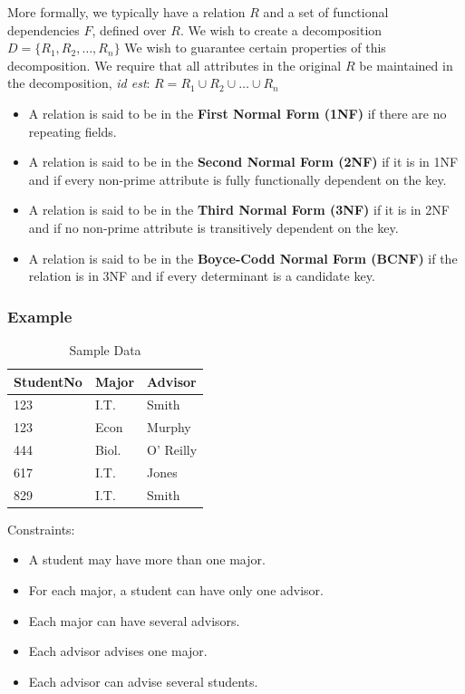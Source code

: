 \documentclass[a4paper,11pt]{article}
\begin{document}
More formally, we typically have a relation $R$ and a set of functional dependencies $F$, defined over $R$. 
We wish to create a decomposition $D = \{R_1, R_2, \dots, R_n\}$
We wish to guarantee certain properties of this decomposition.
We require that all attributes in the original $R$ be maintained in the decomposition, \textit{id est}:
$R = R_1 \cup R_2 \cup \dots \cup R_n$
\begin{itemize}
    \item   A relation is said to be in the \textbf{First Normal Form (1NF)} if there are no repeating fields. 
    \item   A relation is said to be in the \textbf{Second Normal Form (2NF)} if it is in 1NF and if every non-prime 
            attribute is fully functionally dependent on the key.
    \item   A relation is said to be in the \textbf{Third Normal Form (3NF)} if it is in 2NF and if no non-prime 
            attribute is transitively dependent on the key.
    \item   A relation is said to be in the \textbf{Boyce-Codd Normal Form (BCNF)} if the relation is in 3NF and if 
            every determinant is a candidate key.
\end{itemize}

\subsubsection{Example}
\begin{table}[H]
    \centering
    \begin{tabular}{lll}
    \hline
    StudentNo & Major & Advisor   \\ \hline
    123       & I.T.  & Smith     \\
    123       & Econ  & Murphy    \\
    444       & Biol. & O' Reilly \\
    617       & I.T.  & Jones     \\
    829       & I.T.  & Smith     \\ \hline
    \end{tabular}
    \caption{Sample Data}
\end{table}

Constraints:
\begin{itemize}
    \item   A student may have more than one major. 
    \item   For each major, a student can have only one advisor. 
    \item   Each major can have several advisors. 
    \item   Each advisor advises one major.
    \item   Each advisor can advise several students.
\end{itemize}
\end{document}
